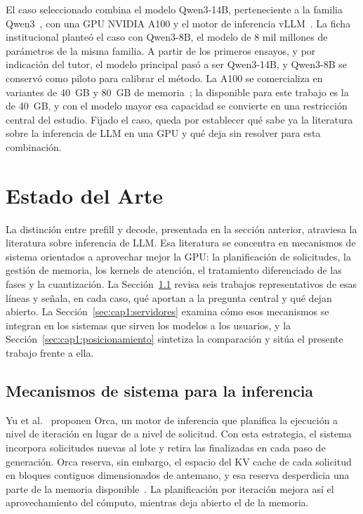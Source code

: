 El caso seleccionado combina el modelo Qwen3-14B, perteneciente a la familia Qwen3~\cite{qwen2025qwen3}, con una GPU NVIDIA A100 y el motor de inferencia vLLM~\cite{kwon2023pagedattention}. La ficha institucional planteó el caso con Qwen3-8B, el modelo de 8 mil millones de parámetros de la misma familia. A partir de los primeros ensayos, y por indicación del tutor, el modelo principal pasó a ser Qwen3-14B, y Qwen3-8B se conservó como piloto para calibrar el método. La A100 se comercializa en variantes de 40~GB y 80~GB de memoria~\cite{nvidia2021a100}; la disponible para este trabajo es la de 40~GB, y con el modelo mayor esa capacidad se convierte en una restricción central del estudio. Fijado el caso, queda por establecer qué sabe ya la literatura sobre la inferencia de LLM en una GPU y qué deja sin resolver para esta combinación.

\section{Estado del Arte}
\label{sec:cap1:estado-arte}

La distinción entre prefill y decode, presentada en la sección anterior, atraviesa la literatura sobre inferencia de LLM. Esa literatura se concentra en mecanismos de sistema orientados a aprovechar mejor la GPU: la planificación de solicitudes, la gestión de memoria, los kernels de atención, el tratamiento diferenciado de las fases y la cuantización. La Sección~\ref{sec:cap1:mecanismos} revisa seis trabajos representativos de esas líneas y señala, en cada caso, qué aportan a la pregunta central y qué dejan abierto. La Sección~\ref{sec:cap1:servidores} examina cómo esos mecanismos se integran en los sistemas que sirven los modelos a los usuarios, y la Sección~\ref{sec:cap1:posicionamiento} sintetiza la comparación y sitúa el presente trabajo frente a ella.

\subsection{Mecanismos de sistema para la inferencia}
\label{sec:cap1:mecanismos}

Yu et al.~\cite{yu2022orca} proponen Orca, un motor de inferencia que planifica la ejecución a nivel de iteración en lugar de a nivel de solicitud. Con esta estrategia, el sistema incorpora solicitudes nuevas al lote y retira las finalizadas en cada paso de generación. Orca reserva, sin embargo, el espacio del KV cache de cada solicitud en bloques contiguos dimensionados de antemano, y esa reserva desperdicia una parte de la memoria disponible~\cite{kwon2023pagedattention}. La planificación por iteración mejora así el aprovechamiento del cómputo, mientras deja abierto el de la memoria.


